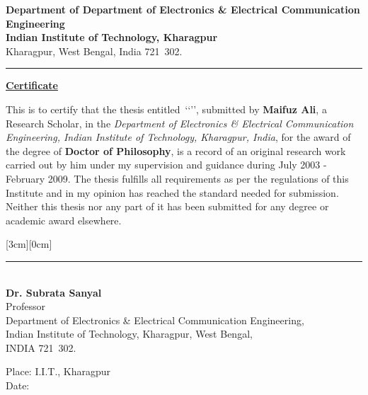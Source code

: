 \thispagestyle{empty}

\begin{figure}[htbp]
\end{figure}

\vspace*{-4.0\baselineskip}

\hspace*{2cm} {\large{\bf{\sf Department of Department of Electronics \& Electrical Communication}}} \\ 
\hspace*{2.6cm} {\large{\bf{\sf Engineering}}} \\
\hspace*{2.6cm}   {\large{\bf{\sf Indian Institute of Technology, Kharagpur}}}\\
\hspace*{2.6cm}   {\large{\sf Kharagpur, West Bengal, India 721\ 302.}}\\
\vspace*{0.5cm}
\rule{\textwidth}{0.75pt}

\baselineskip
\centerline{\underline{\Large{\bf Certificate}}}
\baselineskip
\noindent
This is to certify that the thesis entitled~\lq\lq\textbf{}\rq\rq, submitted by \textbf{Maifuz Ali}, a Research Scholar, in the \emph{Department of Electronics \& Electrical Communication Engineering, Indian Institute of Technology, Kharagpur, India}, for the award of the degree of \textbf{Doctor of Philosophy}, is a record of an original research work carried out by him under my supervision and guidance during July 2003 - February 2009. The thesis fulfills all requirements as per the regulations of this Institute and in my opinion has reached the standard needed for submission. Neither this thesis nor any part of it has been submitted for any degree or academic award elsewhere.

\vspace*{1.5cm}
\begin{flushright}
\raisebox{0.1cm}[3cm][0cm]{
\begin{minipage}{7.8cm}
\rule{\textwidth}{0.5pt}\\
{\bf Dr. Subrata Sanyal}\\
Professor\\
Department of Electronics \& Electrical Communication Engineering,\\
Indian Institute of Technology, Kharagpur, West Bengal,\\
{\sf INDIA} 721\ 302.
\end{minipage}
}
\end{flushright}
\vspace*{0.3cm}
Place: I.I.T.,  Kharagpur\\
Date: \noindent{\today}\\


